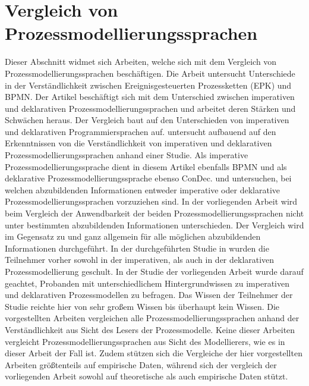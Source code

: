 \section{Vergleich von Prozessmodellierungssprachen}

Dieser Abschnitt widmet sich Arbeiten, welche sich mit dem Vergleich von Prozessmodellierungssprachen beschäftigen.\newline
Die Arbeit \cite{recker2007does} untersucht Unterschiede in der Verständlichkeit zwischen Ereignisgesteuerten Prozessketten (EPK) und BPMN.\newline
Der Artikel \cite{fahland2010} beschäftigt sich mit dem Unterschied zwischen imperativen und deklarativen Prozessmodellierungssprachen und arbeitet deren Stärken und Schwächen heraus. Der Vergleich baut auf den Unterschieden von imperativen und deklarativen Programmiersprachen auf. \newline
\cite{pichler2012} untersucht aufbauend auf den Erkenntnissen von \cite{fahland2010} die Verständlichkeit von imperativen und deklarativen Prozessmodellierungssprachen anhand einer Studie. Als imperative Prozessmodellierungssprache dient in diesem Artikel ebenfalls BPMN und als deklarative Prozessmodellierungssprache ebenso ConDec. \newline 
\cite{fahland2010} und \cite{pichler2012} untersuchen, bei welchen abzubildenden Informationen entweder imperative oder deklarative Prozessmodellierungssprachen vorzuziehen sind. In der vorliegenden Arbeit wird beim Vergleich der Anwendbarkeit der beiden Prozessmodellierungssprachen nicht unter bestimmten abzubildenden Informationen unterschieden. Der Vergleich wird im Gegensatz zu \cite{fahland2010} und \cite{pichler2012}  ganz allgemein für alle möglichen abzubildenden Informationen durchgeführt. \newline
In der durchgeführten Studie in \cite{pichler2012} wurden die Teilnehmer vorher sowohl in der imperativen, als auch in der deklarativen Prozessmodellierung geschult. In der Studie der vorliegenden Arbeit wurde darauf geachtet, Probanden mit unterschiedlichem Hintergrundwissen zu imperativen und deklarativen Prozessmodellen zu befragen. Das Wissen der Teilnehmer der Studie reichte hier von sehr großem Wissen bis überhaupt kein Wissen.\newline
Die vorgestellten Arbeiten vergleichen alle Prozessmodellierungssprachen anhand der Verständlichkeit aus Sicht des Lesers der Prozessmodelle. Keine dieser Arbeiten vergleicht Prozessmodellierungssprachen aus Sicht des Modellierers, wie es in dieser Arbeit der Fall ist. Zudem stützen sich die Vergleiche der hier vorgestellten Arbeiten größtenteils auf empirische Daten, während sich der vergleich der vorliegenden Arbeit sowohl auf theoretische als auch empirische Daten stützt.



